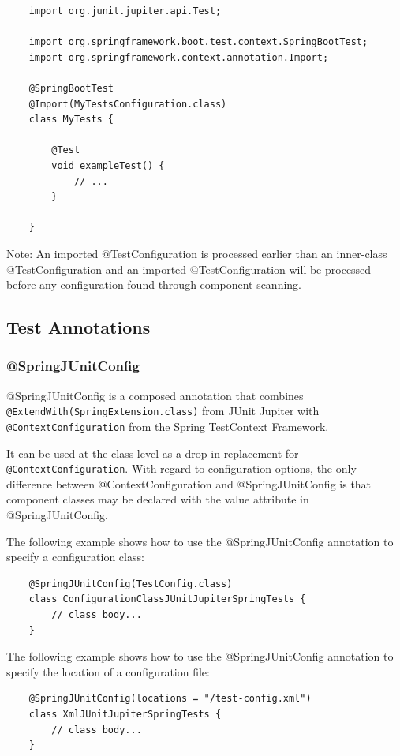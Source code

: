 \documentclass{scrartcl}
\begin{document}
\begin{lstlisting}
    import org.junit.jupiter.api.Test;

    import org.springframework.boot.test.context.SpringBootTest;
    import org.springframework.context.annotation.Import;

    @SpringBootTest
    @Import(MyTestsConfiguration.class)
    class MyTests {

        @Test
        void exampleTest() {
            // ...
        }

    }
\end{lstlisting}

Note: An imported @TestConfiguration is processed earlier than an inner-class @TestConfiguration and an imported @TestConfiguration will be processed before any configuration found through component scanning.


\subsection{Test Annotations}

\subsubsection{@SpringJUnitConfig}

@SpringJUnitConfig is a composed annotation that combines \lstinline|@ExtendWith(SpringExtension.class)| from JUnit Jupiter with \lstinline|@ContextConfiguration| from the Spring TestContext Framework.

It can be used at the class level as a drop-in replacement for \lstinline|@ContextConfiguration|. With regard to configuration options, the only difference between @ContextConfiguration and @SpringJUnitConfig is that component classes may be declared with the value attribute in @SpringJUnitConfig.

The following example shows how to use the @SpringJUnitConfig annotation to specify a configuration class:

\begin{lstlisting}
    @SpringJUnitConfig(TestConfig.class)
    class ConfigurationClassJUnitJupiterSpringTests {
        // class body...
    }

\end{lstlisting}

The following example shows how to use the @SpringJUnitConfig annotation to specify the location of a configuration file:

\begin{lstlisting}
    @SpringJUnitConfig(locations = "/test-config.xml")
    class XmlJUnitJupiterSpringTests {
        // class body...
    }
\end{lstlisting}
\end{document}
